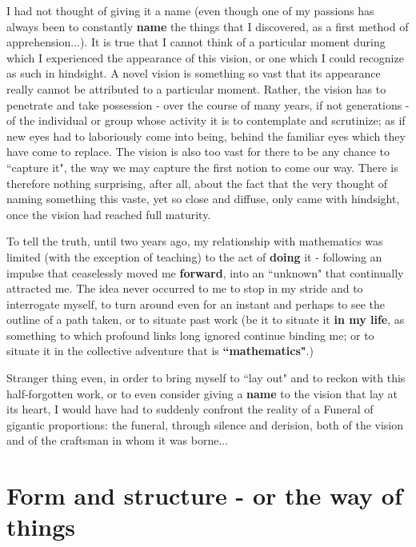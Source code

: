 I had not thought of giving it a name (even though one of my passions has always been to constantly  \textbf{name} the things that I discovered, as a first method of apprehension...). It is true that I cannot think of a particular moment during which I experienced the appearance of this vision, or one which I could recognize as such in hindsight. A novel vision is something so vast that its appearance really cannot be attributed to a particular moment. Rather, the vision has to penetrate and take possession - over the course of many years, if not generations - of the individual or group whose activity it is to contemplate and scrutinize; as if new eyes had to laboriously come into being, behind the familiar eyes which they have come to replace. The vision is also too vast for there to be any chance to ``capture it", the way we may capture the first notion to come our way. There is therefore nothing surprising, after all, about the fact that the very thought of naming something this vaste, yet so close and diffuse, only came with hindsight, once the vision had reached full maturity.

To tell the truth, until two years ago, my relationship with mathematics was limited (with the exception of teaching) to the act of \textbf{doing} it - following an impulse that ceaselessly moved me \textbf{forward}, into an ``unknown" that continually attracted me. The idea never occurred to me to stop in my stride and to interrogate myself, to turn around even for an instant and perhaps to see the outline of a path taken, or to situate past work (be it to situate it \textbf{in my life}, as something to which profound links long ignored continue binding me; or to situate it in the collective adventure that is \textbf{``mathematics"}.)

Stranger thing even, in order to bring myself to ``lay out" and to reckon with this half-forgotten work, or to even consider giving a \textbf{name} to the vision that lay at its heart, I would have had to suddenly confront the reality of a Funeral of gigantic proportions: the funeral, through silence and derision, both of the vision and of the craftsman in whom it was borne...

\section{Form and structure - or the way of things}

